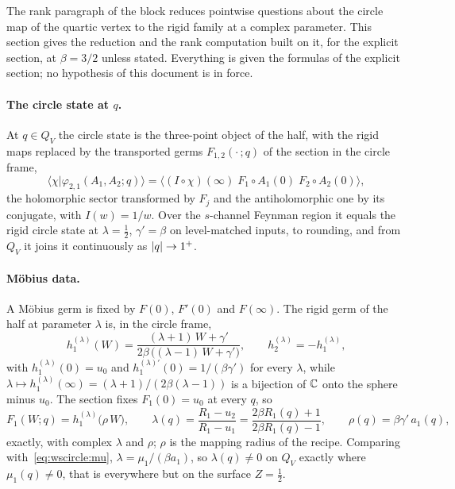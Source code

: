 
The rank paragraph of the block reduces pointwise questions about the circle map of the quartic vertex to the rigid family at a complex parameter.
This section gives the reduction and the rank computation built on it, for the explicit section, at $\beta = 3 / 2$ unless stated.
Everything is given the formulas of the explicit section; no hypothesis of this document is in force.

\paragraph{The circle state at \texorpdfstring{$q$}{q}.}
At $q \in Q_V$ the circle state is the three-point object of the half, with the rigid maps replaced by the transported germs $F_{1,2}(\cdot \,; q)$ of the section in the circle frame,
\begin{equation}
  \big\langle \chi \big| \varphi_{2,1}(A_1, A_2; q) \big\rangle
    = \big\langle (I \circ \chi)(\infty) \; F_1 \circ A_1(0) \; F_2 \circ A_2(0) \big\rangle,
\end{equation}
the holomorphic sector transformed by $F_j$ and the antiholomorphic one by its conjugate, with $I(w) = 1 / w$.
Over the $s$-channel Feynman region it equals the rigid circle state at $\lambda = \tfrac{1}{2}$, $\gamma' = \beta$ on level-matched inputs, to rounding, and from $Q_V$ it joins it continuously as ${|q|} \to 1^+$.

\paragraph{Möbius data.}
A Möbius germ is fixed by $F(0)$, $F'(0)$ and $F(\infty)$.
The rigid germ of the half at parameter $\lambda$ is, in the circle frame,
\begin{equation}
  h_1^{(\lambda)}(W)
    = \frac{(\lambda + 1) \, W + \gamma'}{2 \beta \, \big( (\lambda - 1) \, W + \gamma' \big)},
  \qquad
  h_2^{(\lambda)}
    = - h_1^{(\lambda)},
\end{equation}
with $h_1^{(\lambda)}(0) = u_0$ and $h_1^{(\lambda) \prime}(0) = 1 / (\beta \gamma')$ for every $\lambda$, while $\lambda \mapsto h_1^{(\lambda)}(\infty) = (\lambda + 1) / (2 \beta (\lambda - 1))$ is a bijection of $\mathbb{C}$ onto the sphere minus $u_0$.
The section fixes $F_1(0) = u_0$ at every $q$, so
\begin{equation}
  \label{eq:wscircle:mobius-data}
  F_1(W; q)
    = h_1^{(\lambda)} \big( \rho \, W \big),
  \qquad
  \lambda(q)
    = \frac{R_1 - u_2}{R_1 - u_1}
    = \frac{2 \beta R_1(q) + 1}{2 \beta R_1(q) - 1},
  \qquad
  \rho(q)
    = \beta \gamma' \, a_1(q),
\end{equation}
exactly, with complex $\lambda$ and $\rho$; $\rho$ is the mapping radius of the recipe.
Comparing with~\eqref{eq:wscircle:mu}, $\lambda = \mu_1 / (\beta a_1)$, so $\lambda(q) \neq 0$ on $Q_V$ exactly where $\mu_1(q) \neq 0$, that is everywhere but on the surface $Z = \tfrac{1}{2}$.


